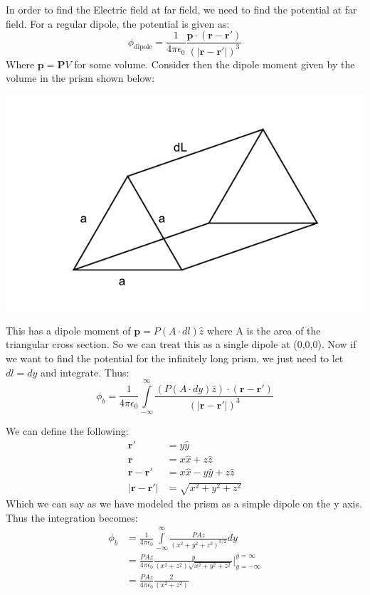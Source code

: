 \documentclass[a4paper, 11pt]{article}
\begin{document}
In order to find the Electric field at far field, we need to find the potential at far field. For a regular dipole, the potential is given as: 
	\begin{equation*}
		\phi_{\text{dipole}} = \frac{1}{4\pi\epsilon_0}\frac{\mathbf{p}\cdot(\mathbf{r-r'})}{(|\mathbf{r-r'}|)^3}
	\end{equation*}
Where $\mathbf{p} = \mathbf{P}V$ for some volume. Consider then the dipole moment given by the volume in the prism shown below: \\
	\begin{center}
		\includegraphics[scale=0.5]{prism}
	\end{center}
	
\noindent This has a dipole moment of $\mathbf{p} = P(A \cdot dl) \hat{z}$ where A is the area of the triangular cross section. So we can treat this as a single dipole at (0,0,0). Now if we want to find the potential for the infinitely long prism, we just need to let $dl = dy$ and integrate. Thus: 
	\begin{equation*}
		\phi_b = \frac{1}{4\pi\epsilon_0}\int\limits_{-\infty}^{\infty}\frac{(P(A \cdot dy) \hat{z})\cdot (\mathbf{r-r'})}{(|\mathbf{r-r'}|)^3}
	\end{equation*}

We can define the following: 
	\begin{align*}
		\mathbf{r'} &= y\hat{y} \\ 
		\mathbf{r} &= x\hat{x} + z\hat{z} \\ 
		\mathbf{r-r'} &= x\hat{x} -y\hat{y} + z\hat{z} \\ 
		|\mathbf{r-r'}| &= \sqrt{x^2+y^2+z^2}
	\end{align*}
Which we can say as we have modeled the prism as a simple dipole on the y axis. Thus the integration becomes: 
	\begin{align*}
		\phi_b &= \frac{1}{4\pi\epsilon_0}\int\limits_{-\infty}^{\infty}\frac{PAz}{(x^2+y^2+z^2)^{3/2}}dy \\
		&=\frac{PAz}{4\pi\epsilon_0}\frac{y}{(x^2+z^2)\sqrt{x^2+y^2+z^2}} \Bigg|_{y=-\infty}^{y=\infty} \\
		&=\frac{PAz}{4\pi\epsilon_0}\frac{2}{(x^2+z^2)}
	\end{align*}
\end{document}
